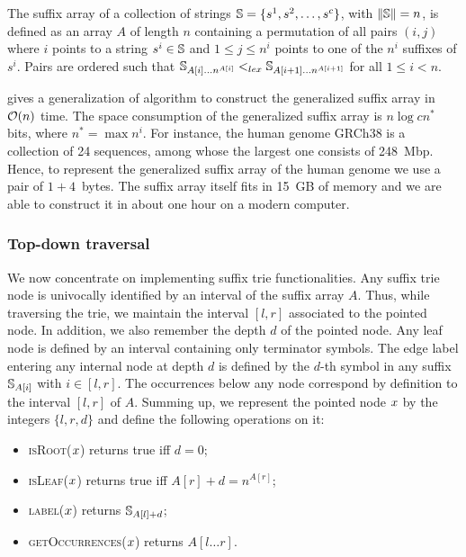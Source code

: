 \begin{definition}
The suffix array of a collection of strings $\mathbb {S} = \{ s^1, s^2, \dots, s^c \}$, with $\left\lVert\mathbb {S}\right\rVert=n$, is defined as an array $A$ of length $n$ containing a permutation of all pairs $(i,j)$ where $i$ points to a string $s^i \in \mathbb {S}$ and $1 \leq j \leq n^i$ points to one of the $n^i$ suffixes of $s^i$.
Pairs are ordered such that $\mathbb {S}_{A[i] \dots n^{A[i]}} <_{lex} \mathbb {S}_{A[i+1] \dots n^{A[i+1]}}$ for all $1 \leq i < n$.
\end{definition}

\citep{Weese2013} gives a generalization of \citeauthor{Karkkainen2003} algorithm to construct the generalized suffix array in $\mathcal{O}(n)$ time.
The space consumption of the generalized suffix array is $n \log{cn^*}$ bits, where $n^* = \max{n^i}$.
For instance, the human genome GRCh38 is a collection of 24 sequences, among whose the largest one consists of 248~Mbp.
Hence, to represent the generalized suffix array of the human genome we use a pair of $1+4$~bytes.
The suffix array itself fits in 15~GB of memory and we are able to construct it in about one hour on a modern computer.

\subsubsection{Top-down traversal}

We now concentrate on implementing suffix trie functionalities.
Any suffix trie node is univocally identified by an interval of the suffix array $A$.
Thus, while traversing the trie, we maintain the interval $[l,r]$ associated to the pointed node.
In addition, we also remember the depth $d$ of the pointed node.
Any leaf node is defined by an interval containing only terminator symbols.
The edge label entering any internal node at depth $d$ is defined by the $d$-th symbol in any suffix $\mathbb {S}_{A[i]}$ with $i \in [l,r]$.
The occurrences below any node correspond by definition to the interval $[l,r]$ of $A$.
Summing up, we represent the pointed node $x$ by the integers $\{ l, r ,d \}$ and define the following operations on it:
\begin{itemize}
\item \textsc{isRoot}($x$) returns true iff $d = 0$;
\item \textsc{isLeaf}($x$) returns true iff $A[r] + d = n^{A[r]}$;
\item \textsc{label}($x$) returns $\mathbb {S}_{A[l] + d}$;
\item \textsc{getOccurrences}($x$) returns $A[l \dots r]$.
\end{itemize}

